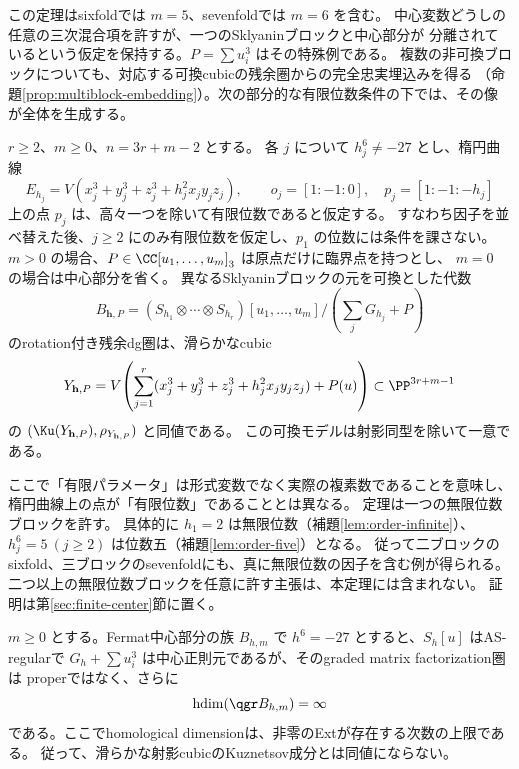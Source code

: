 この定理はsixfoldでは \(m=5\)、sevenfoldでは \(m=6\) を含む。
中心変数どうしの任意の三次混合項を許すが、一つのSklyaninブロックと中心部分が
分離されているという仮定を保持する。\(P=\sum u_i^3\) はその特殊例である。
複数の非可換ブロックについても、対応する可換cubicの残余圏からの完全忠実埋込みを得る
（命題\ref{prop:multiblock-embedding}）。次の部分的な有限位数条件の下では、その像が全体を生成する。

\begin{theorem}[一つの任意位数ブロックを許す多ブロック可換モデル]\label{thm:multiblock-model}
 \(r\ge2\)、\(m\ge0\)、\(n=3r+m-2\) とする。
 各 \(j\) について \(h_j^6\ne-27\) とし、楕円曲線
 \[
 E_{h_j}=V(x_j^3+y_j^3+z_j^3+h_j^2x_jy_jz_j),\qquad
 o_j=[1:-1:0],\quad p_j=[1:-1:-h_j]
 \]
 上の点 \(p_j\) は、高々一つを除いて有限位数であると仮定する。
 すなわち因子を並べ替えた後、\(j\ge2\) にのみ有限位数を仮定し、\(p_1\) の位数には条件を課さない。
 \(m>0\) の場合、\(P\in\CC[u_1,\ldots,u_m]_3\) は原点だけに臨界点を持つとし、
 \(m=0\) の場合は中心部分を省く。
 異なるSklyaninブロックの元を可換とした代数
 \[
 B_{\mathbf h,P}=
 (S_{h_1}\otimes\cdots\otimes S_{h_r})[u_1,\ldots,u_m]
 \big/\left(\sum_jG_{h_j}+P\right)
 \]
 のrotation付き残余dg圏は、滑らかなcubic
 \[
 Y_{\mathbf h,P}=V\!\left(
 \sum_{j=1}^r(x_j^3+y_j^3+z_j^3+h_j^2x_jy_jz_j)+P(u)
 \right)\subset\PP^{3r+m-1}
 \]
 の \((\Ku(Y_{\mathbf h,P}),\rho_{Y_{\mathbf h,P}})\) と同値である。
 この可換モデルは射影同型を除いて一意である。
\end{theorem}

ここで「有限パラメータ」は形式変数でなく実際の複素数であることを意味し、
楕円曲線上の点が「有限位数」であることとは異なる。
定理は一つの無限位数ブロックを許す。
具体的に \(h_1=2\) は無限位数（補題\ref{lem:order-infinite}）、
\(h_j^6=5\ (j\ge2)\) は位数五（補題\ref{lem:order-five}）となる。
従って二ブロックのsixfold、三ブロックのsevenfoldにも、真に無限位数の因子を含む例が得られる。
二つ以上の無限位数ブロックを任意に許す主張は、本定理には含まれない。
証明は第\ref{sec:finite-center}節に置く。

\begin{proposition}\label{prop:bad-intro}
 \(m\ge0\) とする。Fermat中心部分の族 \(B_{h,m}\) で \(h^6=-27\) とすると、\(S_h[u]\) はAS-regularで
 \(G_h+\sum u_i^3\) は中心正則元であるが、そのgraded matrix factorization圏は
 properではなく、さらに
 \[
 \operatorname{hdim}(\qgr B_{h,m})=\infty
 \]
 である。ここでhomological dimensionは、非零のExtが存在する次数の上限である。
 従って、滑らかな射影cubicのKuznetsov成分とは同値にならない。
\end{proposition}

